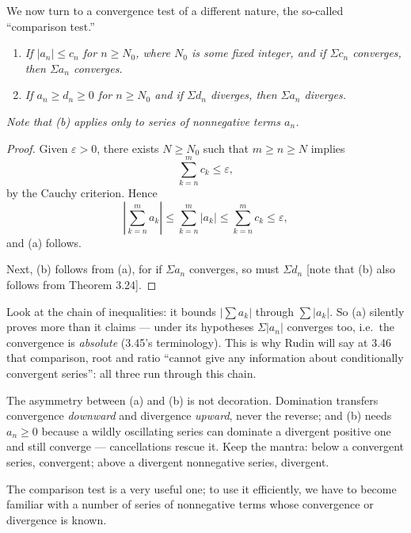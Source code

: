 We now turn to a convergence test of a different nature, the so-called
``comparison test.''

\begin{enumerate}[label=(\alph*), leftmargin=2.2em, itemsep=2pt, topsep=3pt]
  \item \emph{If $|a_n| \le c_n$ for $n \ge N_0$, where $N_0$ is some fixed
        integer, and if $\Sigma c_n$ converges, then $\Sigma a_n$ converges.}
  \item \emph{If $a_n \ge d_n \ge 0$ for $n \ge N_0$ and if $\Sigma d_n$
        diverges, then $\Sigma a_n$ diverges.}
\end{enumerate}
\emph{Note that (b) applies only to series of nonnegative terms $a_n$.}

\begin{proof}
Given $\varepsilon > 0$, there exists $N \ge N_0$ such that $m \ge n \ge N$
implies
\[ \sum_{k=n}^{m} c_k \le \varepsilon, \]
by the Cauchy criterion. Hence
\[ \left|\sum_{k=n}^{m} a_k\right| \le \sum_{k=n}^{m} |a_k|
   \le \sum_{k=n}^{m} c_k \le \varepsilon, \]
and (a) follows.

Next, (b) follows from (a), for if $\Sigma a_n$ converges, so must $\Sigma d_n$
[note that (b) also follows from Theorem 3.24].
\end{proof}

\begin{unpack}
Look at the chain of inequalities: it bounds $|\sum a_k|$ through
$\sum|a_k|$. So (a) silently proves more than it claims --- under its
hypotheses $\Sigma|a_n|$ converges too, i.e.\ the convergence is
\emph{absolute} (3.45's terminology). This is why Rudin will say at 3.46 that
comparison, root and ratio ``cannot give any information about conditionally
convergent series'': all three run through this chain.

The asymmetry between (a) and (b) is not decoration. Domination transfers
convergence \emph{downward} and divergence \emph{upward}, never the reverse;
and (b) needs $a_n \ge 0$ because a wildly oscillating series can dominate a
divergent positive one and still converge --- cancellations rescue it. Keep
the mantra: below a convergent series, convergent; above a divergent
nonnegative series, divergent.
\end{unpack}

The comparison test is a very useful one; to use it efficiently, we have to
become familiar with a number of series of nonnegative terms whose convergence
or divergence is known.

